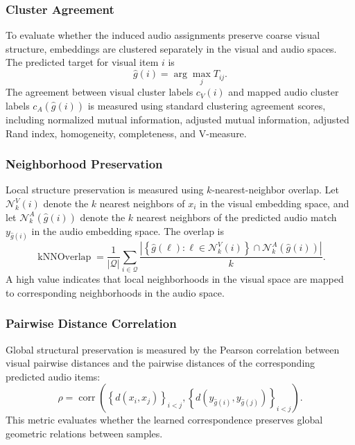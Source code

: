 \subsubsection{Cluster Agreement}

To evaluate whether the induced audio assignments preserve coarse visual structure, embeddings are clustered separately in the visual and audio spaces. The predicted target for visual item $i$ is
\begin{equation}
    \hat{g}(i)=\arg\max_j T_{ij}.
\end{equation}
The agreement between visual cluster labels $c_V(i)$ and mapped audio cluster labels $c_A(\hat{g}(i))$ is measured using standard clustering agreement scores, including normalized mutual information, adjusted mutual information, adjusted Rand index, homogeneity, completeness, and V-measure.

\subsubsection{Neighborhood Preservation}

Local structure preservation is measured using $k$-nearest-neighbor overlap. Let $\mathcal{N}^V_k(i)$ denote the $k$ nearest neighbors of $x_i$ in the visual embedding space, and let $\mathcal{N}^A_k(\hat{g}(i))$ denote the $k$ nearest neighbors of the predicted audio match $y_{\hat{g}(i)}$ in the audio embedding space. The overlap is
\begin{equation}
    \operatorname{kNNOverlap}
    =
    \frac{1}{|\mathcal{Q}|}
    \sum_{i \in \mathcal{Q}}
    \frac{
    \left|
    \left\{
    \hat{g}(\ell): \ell \in \mathcal{N}^V_k(i)
    \right\}
    \cap
    \mathcal{N}^A_k(\hat{g}(i))
    \right|
    }{k}.
    \label{eq:knn_overlap}
\end{equation}
A high value indicates that local neighborhoods in the visual space are mapped to corresponding neighborhoods in the audio space.

\subsubsection{Pairwise Distance Correlation}

Global structural preservation is measured by the Pearson correlation between visual pairwise distances and the pairwise distances of the corresponding predicted audio items:
\begin{equation}
    \rho
    =
    \operatorname{corr}
    \left(
    \left\{
    d(x_i,x_j)
    \right\}_{i<j},
    \left\{
    d(y_{\hat{g}(i)},y_{\hat{g}(j)})
    \right\}_{i<j}
    \right).
    \label{eq:distance_correlation}
\end{equation}
This metric evaluates whether the learned correspondence preserves global geometric relations between samples.

